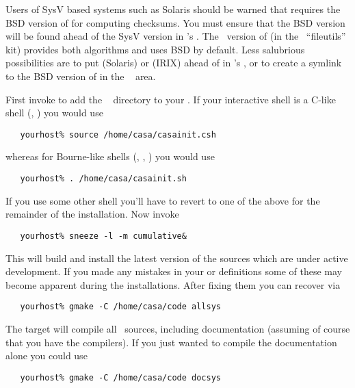 Users of SysV based systems such as Solaris should be warned that
 requires the BSD version of  for computing
checksums.  You must ensure that the BSD version will be found ahead of the
SysV version in 's .  The \gnu\ version of
 (in the \gnu\ ``fileutils'' kit) provides both algorithms and
uses BSD by default.  Less salubrious possibilities are to put 
(Solaris) or  (IRIX) ahead of  in
's , or to create a symlink to the BSD version of
 in the \aipspp\  area.  

First invoke  to add the \aipspp\  directory to
your .  If your interactive shell is a C-like shell (,
) you would use

\begin{verbatim}
   yourhost% source /home/casa/casainit.csh
\end{verbatim}

\noindent
whereas for Bourne-like shells (, , )
you would use

\begin{verbatim}
   yourhost% . /home/casa/casainit.sh
\end{verbatim}

\noindent
If you use some other shell you'll have to revert to one of the above for the
remainder of the installation.  Now invoke 

\begin{verbatim}
   yourhost% sneeze -l -m cumulative&
\end{verbatim}

\noindent
This will build and install
the latest version of the sources which are under active development.  If you
made any mistakes in your  or  definitions some of
these may become apparent during the installations.  After fixing them you can
recover via

\begin{verbatim}
   yourhost% gmake -C /home/casa/code allsys
\end{verbatim}

\noindent
The  target will compile all \aipspp\ sources, including
documentation (assuming of course that you have the compilers).  If you just
wanted to compile the documentation alone you could use

\begin{verbatim}
   yourhost% gmake -C /home/casa/code docsys
\end{verbatim}


